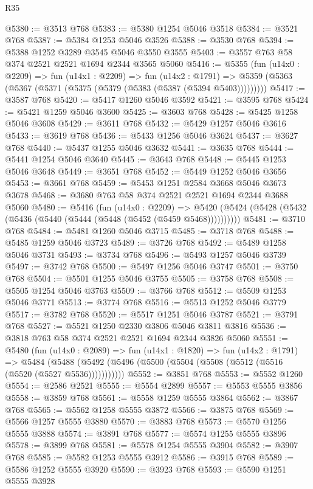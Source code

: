 \begin{lexlean}{R35}
\begin{coremodule}
@5380 := @3513 @768
@5383 := @5380 @1254 @5046 @3518
@5384 := @3521 @768
@5387 := @5384 @1253 @5046 @3526
@5388 := @3530 @768
@5394 := @5388 @1252 @3289 @3545 @5046 @3550 @3555
@5403 := @3557 @763 @58 @374 @2521 @2521 @1694 @2344 @3565 @5060
@5416 := @5355
    (fun (u14x0 : @2209) =>
    fun (u14x1 : @2209) =>
    fun (u14x2 : @1791) =>
    @5359 (@5363 (@5367 (@5371 (@5375 (@5379 (@5383 (@5387 (@5394 @5403)))))))))
@5417 := @3587 @768
@5420 := @5417 @1260 @5046 @3592
@5421 := @3595 @768
@5424 := @5421 @1259 @5046 @3600
@5425 := @3603 @768
@5428 := @5425 @1258 @5046 @3608
@5429 := @3611 @768
@5432 := @5429 @1257 @5046 @3616
@5433 := @3619 @768
@5436 := @5433 @1256 @5046 @3624
@5437 := @3627 @768
@5440 := @5437 @1255 @5046 @3632
@5441 := @3635 @768
@5444 := @5441 @1254 @5046 @3640
@5445 := @3643 @768
@5448 := @5445 @1253 @5046 @3648
@5449 := @3651 @768
@5452 := @5449 @1252 @5046 @3656
@5453 := @3661 @768
@5459 := @5453 @1251 @2584 @3668 @5046 @3673 @3678
@5468 := @3680 @763 @58 @374 @2521 @2521 @1694 @2344 @3688 @5060
@5480 := @5416
    (fun (u14x0 : @2209) =>
    @5420 (@5424 (@5428 (@5432 (@5436 (@5440 (@5444 (@5448 (@5452 (@5459 @5468))))))))))
@5481 := @3710 @768
@5484 := @5481 @1260 @5046 @3715
@5485 := @3718 @768
@5488 := @5485 @1259 @5046 @3723
@5489 := @3726 @768
@5492 := @5489 @1258 @5046 @3731
@5493 := @3734 @768
@5496 := @5493 @1257 @5046 @3739
@5497 := @3742 @768
@5500 := @5497 @1256 @5046 @3747
@5501 := @3750 @768
@5504 := @5501 @1255 @5046 @3755
@5505 := @3758 @768
@5508 := @5505 @1254 @5046 @3763
@5509 := @3766 @768
@5512 := @5509 @1253 @5046 @3771
@5513 := @3774 @768
@5516 := @5513 @1252 @5046 @3779
@5517 := @3782 @768
@5520 := @5517 @1251 @5046 @3787
@5521 := @3791 @768
@5527 := @5521 @1250 @2330 @3806 @5046 @3811 @3816
@5536 := @3818 @763 @58 @374 @2521 @2521 @1694 @2344 @3826 @5060
@5551 := @5480
    (fun (u14x0 : @2089) =>
    fun (u14x1 : @1820) =>
    fun (u14x2 : @1791) =>
    @5484 (@5488 (@5492 (@5496 (@5500 (@5504 (@5508 (@5512 (@5516 (@5520 (@5527 @5536)))))))))))
@5552 := @3851 @768
@5553 := @5552 @1260
@5554 := @2586 @2521
@5555 := @5554 @2899
@5557 := @5553 @5555 @3856
@5558 := @3859 @768
@5561 := @5558 @1259 @5555 @3864
@5562 := @3867 @768
@5565 := @5562 @1258 @5555 @3872
@5566 := @3875 @768
@5569 := @5566 @1257 @5555 @3880
@5570 := @3883 @768
@5573 := @5570 @1256 @5555 @3888
@5574 := @3891 @768
@5577 := @5574 @1255 @5555 @3896
@5578 := @3899 @768
@5581 := @5578 @1254 @5555 @3904
@5582 := @3907 @768
@5585 := @5582 @1253 @5555 @3912
@5586 := @3915 @768
@5589 := @5586 @1252 @5555 @3920
@5590 := @3923 @768
@5593 := @5590 @1251 @5555 @3928

\end{coremodule}
\end{lexlean}
